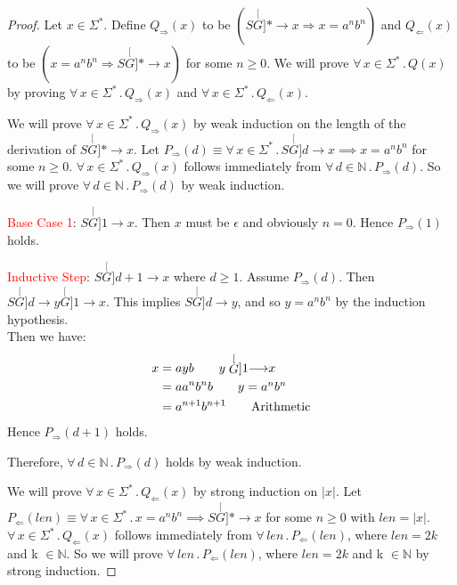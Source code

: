 \documentclass[11pt,fleqn]{article}
\newcommand{\ForallApp}{\forall\,}
\newcommand{\mdot}{\mathrel.}
\newcommand{\der}[2]{\stackrel[#2]{#1}{\longrightarrow}}
\begin{document}
\begin{proof}
Let $x \in \Sigma^*$.  
Define $Q_{\Rightarrow}(x)$ to be $(S \der{*}{G} x \Rightarrow x = a^nb^n)$ and 
$Q_{\Leftarrow}(x)$ to be $(x = a^nb^n \Rightarrow S \der{*}{G} x)$ for some $n \ge 0$.  
We will prove $\ForallApp x \in \Sigma^* \mdot Q(x)$ by proving $\ForallApp x \in \Sigma^* \mdot
Q_{\Rightarrow}(x)$ and $\ForallApp x \in \Sigma^* \mdot
Q_{\Leftarrow}(x)$.

\medskip

We will prove $\ForallApp x \in \Sigma^* \mdot Q_{\Rightarrow}(x)$ by
weak induction on the length of the derivation of $S \der{*}{G} x$.
Let $P_{\Rightarrow}(d) \equiv \ForallApp x \in \Sigma^* \mdot S \der{d}{G} x \implies x = a^nb^n$ for some $n \ge 0$.  $\ForallApp x \in \Sigma^*
\mdot Q_{\Rightarrow}(x)$ follows immediately from $\ForallApp d \in
\mathbb{N} \mdot P_{\Rightarrow}(d)$.  So we will prove $\ForallApp d
\in \mathbb{N} \mdot P_{\Rightarrow}(d)$ by weak induction.

\textcolor{red}{Base Case 1}: $S \der{1}{G} x$.  Then $x$ must be $\epsilon$ and obviously $n = 0$.  Hence
$P_{\Rightarrow}(1)$ holds.

\textcolor{red}{Inductive Step}: $S \der{d+1}{G} x$ where $d \ge 1$.  Assume
$P_{\Rightarrow}(d)$.  Then $S \der{d}{G} y \der{1}{G} x$.
This implies $S \der{d}{G} y$, and so $y = a^nb^n$ by the induction hypothesis. \\
Then we have:
\begin{align}
x &= ayb \tag*{$y \der{1}{G} x$} \\
  &= aa^nb^nb \tag*{$y = a^nb^n$} \\
  &= a^{n+1}b^{n+1} \tag*{Arithmetic} \\
\end{align}
Hence \mbox{$P_{\Rightarrow}(d+1)$} holds.

Therefore, $\ForallApp d \in \mathbb{N} \mdot P_{\Rightarrow}(d)$
holds by weak induction.

\medskip

We will prove $\ForallApp x \in \Sigma^* \mdot Q_{\Leftarrow}(x)$ by
strong induction on $|x|$.  
Let $P_{\Leftarrow}(len) \equiv \ForallApp x \in \Sigma^* \mdot x = a^nb^n \implies S \der{*}{G} x$
for some $n \ge 0$ with $len = |x|$.  
$\ForallApp x \in \Sigma^* \mdot Q_{\Leftarrow}(x)$ 
follows immediately from $\ForallApp len \mdot P_{\Leftarrow}(len)$, 
where $len = 2k$ and k $\in \mathbb{N}$. 
So we will prove $\ForallApp len \mdot P_{\Leftarrow}(len)$, where $len = 2k$ and k $\in \mathbb{N}$ by strong induction.


\end{proof}
\end{document}

